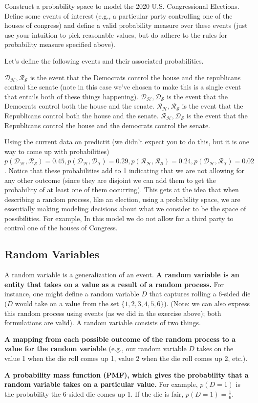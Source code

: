 \documentclass[review_Solutions]{subfiles}
\begin{document}
\begin{exercise}
Construct a probability space to model the 2020 U.S. Congressional Elections.  Define some events of interest (e.g., a particular party controlling one of the houses of congress) and define a valid probability measure over these events (just use your intuition to pick reasonable values, but do adhere to the rules for probability measure specified above).
\begin{boxedsolution}
Let's define the following events and their associated probabilities.
\bi
\item $\mathcal{D_H, R_S}$ is the event that the Democrats control the house and the republicans control the senate (note in this case we've chosen to make this is a single event that entails both of these things happening).  $\mathcal{D_H,D_S}$ is the event that the Democrats control both the house and the senate.  $\mathcal{R_H,R_S}$ is the event that the Republicans control both the house and the senate.  $\mathcal{R_H,D_S}$ is the event that the Republicans control the house and the democrats control the senate.
\item Using the current data on \href{https://www.predictit.org/markets/2/Congress}{predictit} (we didn't expect you to do this, but it is one way to come up with probabilities) $p(\mathcal{D_H, R_S}) = 0.45, p(\mathcal{D_H, D_S}) = 0.29, p(\mathcal{R_H, R_S}) = 0.24, p(\mathcal{D_H, R_S}) = 0.02$.  Notice that these probabilities add to 1 indicating that we are not allowing for any other outcome (since they are disjoint we can add them to get the probability of at least one of them occurring). This gets at the idea that when describing a random process, like an election, using a probability space, we are essentially making modeling decisions about what we consider to be the space of possibilities. For example, In this model we do not allow for a third party to control one of the houses of Congress.
\ei
\end{boxedsolution}
\end{exercise}

\subsection{Random Variables}
A random variable is a generalization of an event.  \textbf{A random variable is an entity that takes on a value as a result of a random process.}  For instance, one might define a random variable $D$ that captures rolling a 6-sided die ($D$ would take on a value from the set $\{1, 2, 3, 4, 5, 6\}$).  (Note: we can also express this random process using events (as we did in the exercise above); both formulations are valid).  A random variable consists of two things.
\bi
\item \textbf{A mapping from each possible outcome of the random process to a value for the random variable} (e.g., our random variable $D$ takes on the value 1 when the die roll comes up 1, value 2 when the die roll comes up 2, etc.).
\item \textbf{A probability mass function (PMF), which gives the probability that a random variable takes on a particular value.}  For example, $p(D = 1)$ is the probability the 6-sided die comes up 1.  If the die is fair, $p(D=1)=\frac{1}{6}$.
\end{document}
